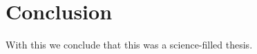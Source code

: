\chapter{Conclusion}
\label{ch:conclusion}

With this we conclude that this was a science-filled thesis.